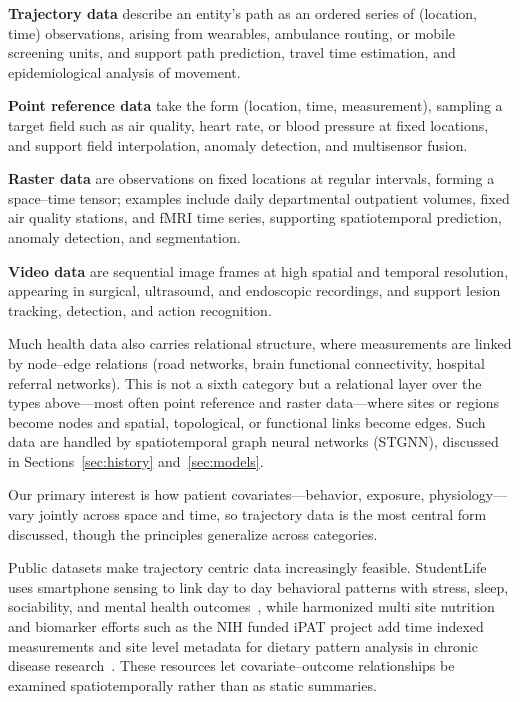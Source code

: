 \documentclass[journal]{IEEEtran}
\begin{document}
\textbf{Trajectory data} describe an entity's path as an ordered series of (location, time) observations, arising from wearables, ambulance routing, or mobile screening units, and support path prediction, travel time estimation, and epidemiological analysis of movement.

\textbf{Point reference data} take the form (location, time, measurement), sampling a target field such as air quality, heart rate, or blood pressure at fixed locations, and support field interpolation, anomaly detection, and multisensor fusion.

\textbf{Raster data} are observations on fixed locations at regular intervals, forming a space--time tensor; examples include daily departmental outpatient volumes, fixed air quality stations, and fMRI time series, supporting spatiotemporal prediction, anomaly detection, and segmentation.

\textbf{Video data} are sequential image frames at high spatial and temporal resolution, appearing in surgical, ultrasound, and endoscopic recordings, and support lesion tracking, detection, and action recognition.

Much health data also carries relational structure, where measurements are linked by node--edge relations (road networks, brain functional connectivity, hospital referral networks). This is not a sixth category but a relational layer over the types above---most often point reference and raster data---where sites or regions become nodes and spatial, topological, or functional links become edges. Such data are handled by spatiotemporal graph neural networks (STGNN), discussed in Sections~\ref{sec:history} and~\ref{sec:models}.

Our primary interest is how patient covariates---behavior, exposure, physiology---vary jointly across space and time, so trajectory data is the most central form discussed, though the principles generalize across categories.

Public datasets make trajectory centric data increasingly feasible. StudentLife uses smartphone sensing to link day to day behavioral patterns with stress, sleep, sociability, and mental health outcomes~\cite{wang2014studentlife}, while harmonized multi site nutrition and biomarker efforts such as the NIH funded iPAT project add time indexed measurements and site level metadata for dietary pattern analysis in chronic disease research~\cite{Fang2021iPAT}. These resources let covariate--outcome relationships be examined spatiotemporally rather than as static summaries.
\end{document}
